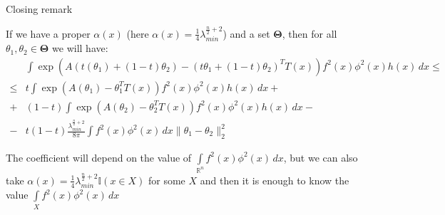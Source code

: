 \documentclass[10pt]{beamer}
\begin{document}
\begin{frame}{Closing remark}

If we have a proper $\alpha(x)$ (here $\alpha(x) = \frac 14 \lambda_{min}^{\frac n2 + 2}$) and a set $\mathbf{\Theta}$, then for all $\theta_1, \theta_2 \in \mathbf{\Theta}$ we will have:
\begin{align*}
&\int \exp(A(t(\theta_1) + (1-t)\theta_2) - (t\theta_1 + (1-t)\theta_2)^TT(x))f^2(x)\phi^2(x)h(x)\, d x  \leq\\
\leq &t \int \exp(A(\theta_1) - \theta_1^TT(x))f^2(x)\phi^2(x)h(x)\, d x +\\
+&(1-t) \int \exp(A(\theta_2) - \theta_2^TT(x))f^2(x)\phi^2(x)h(x)\, d x -\\
-&t(1-t) \frac{\lambda_{min}^{\frac n2 + 2}}{8\pi} \int f^2(x)\phi^2(x)\, dx \|\theta_1 - \theta_2\|^2_2
\end{align*}

The coefficient will depend on the value of $\int \limits_{\mathbb{R}^n} f^2(x)\phi^2(x)\, dx$, but we can also take $\alpha(x) = \frac 14 \lambda_{min}^{\frac n2 + 2} \mathbb{I}(x \in X)$ for some $X$ and then it is enough to know the value $\int \limits_X f^2(x)\phi^2(x)\, dx$

\end{frame}
\end{document}
